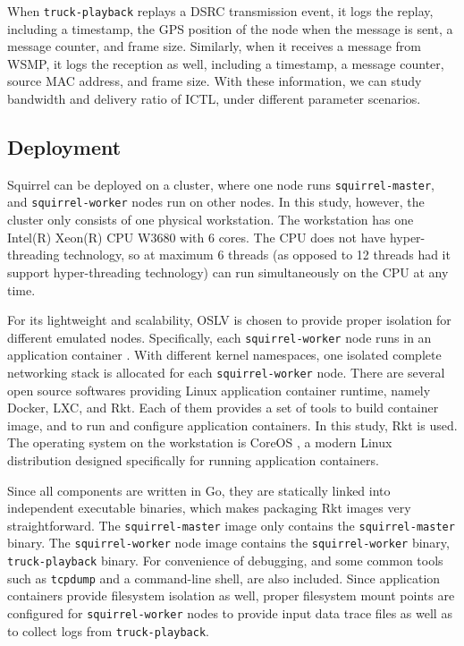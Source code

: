 \documentclass[12pt]{report}
\begin{document}
When \texttt{truck-playback} replays a DSRC transmission event, it logs the replay, including a timestamp, the GPS position of the node when the message is sent, a message counter, and frame size. Similarly, when it receives a message from WSMP, it logs the reception as well, including a timestamp, a message counter, source MAC address, and frame size. With these information, we can study bandwidth and delivery ratio of ICTL, under different parameter scenarios.

\subsection{Deployment}

Squirrel can be deployed on a cluster, where one node runs \texttt{squirrel-master}, and \texttt{squirrel-worker} nodes run on other nodes. In this study, however, the cluster only consists of one physical workstation. The workstation has one Intel(R) Xeon(R) CPU W3680 with 6 cores. The CPU does not have hyper-threading technology, so at maximum 6 threads (as opposed to 12 threads had it support hyper-threading technology) can run simultaneously on the CPU at any time.

For its lightweight and scalability, OSLV is chosen to provide proper isolation for different emulated nodes. Specifically, each \texttt{squirrel-worker} node runs in an application container \cite{menage2007adding}. With different kernel namespaces, one isolated complete networking stack is allocated for each \texttt{squirrel-worker} node. There are several open source softwares providing Linux application container runtime, namely Docker, LXC, and Rkt. Each of them provides a set of tools to build container image, and to run and configure application containers. In this study, Rkt \cite{rkt} is used. The operating system on the workstation is CoreOS \cite{coreos}, a modern Linux distribution designed specifically for running application containers.

Since all components are written in Go, they are statically linked into independent executable binaries, which makes packaging Rkt images very straightforward. The \texttt{squirrel-master} image only contains the \texttt{squirrel-master} binary. The \texttt{squirrel-worker} node image contains the \texttt{squirrel-worker} binary, \texttt{truck-playback} binary. For convenience of debugging, and some common tools such as \texttt{tcpdump} and a command-line shell, are also included. Since application containers provide filesystem isolation as well, proper filesystem mount points are configured for \texttt{squirrel-worker} nodes to provide input data trace files as well as to collect logs from \texttt{truck-playback}.
\end{document}
